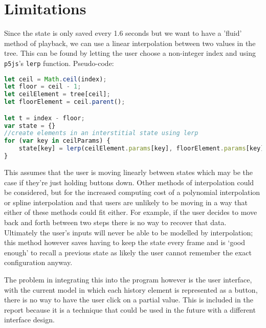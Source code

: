 \section{Limitations}
Since the state is only saved every 1.6 seconds but we want to have a 'fluid'
method of playback, we can use a linear interpolation between two values in the
tree. This can be found by letting the user choose a non-integer index and using
\verb|p5js|'s \verb|lerp| function. Pseudo-code:

\begin{lstlisting}[language=javascript]
let ceil = Math.ceil(index);
let floor = ceil - 1;
let ceilElement = tree[ceil];
let floorElement = ceil.parent();

let t = index - floor;
var state = {}
//create elements in an interstitial state using lerp
for (var key in ceilParams) {
    state[key] = lerp(ceilElement.params[key], floorElement.params[key], t);
}
\end{lstlisting}

This assumes that the user is moving linearly between states which
may be the case if they're just holding buttons down. Other methods of
interpolation could be considered, but for the increased computing cost of a
polynomial interpolation or spline interpolation and that users are
unlikely to be moving in a way that either of these methods could fit either.
For example, if the user decides to move back and forth between two steps there
is no way to recover that data. Ultimately the user's inputs will never be able
to be modelled by interpolation; this method however saves having to keep the
state every frame and is `good enough' to recall a previous state as likely the
user cannot remember the exact configuration anyway.

The problem in integrating this into the program however is the user interface,
with the current model in which each history element is represented as a button,
there is no way to have the user click on a partial value. This is included in
the report because it is a technique that could be used in the future with a
different interface design.
